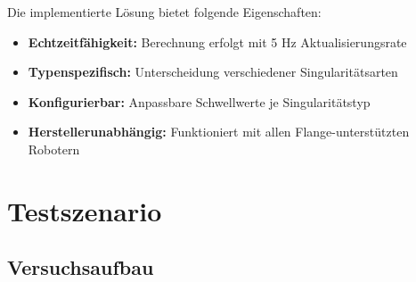 Die implementierte Lösung bietet folgende Eigenschaften:
\begin{itemize}
    \item \textbf{Echtzeitfähigkeit:} Berechnung erfolgt mit 5 Hz Aktualisierungsrate
    \item \textbf{Typenspezifisch:} Unterscheidung verschiedener Singularitätsarten
    \item \textbf{Konfigurierbar:} Anpassbare Schwellwerte je Singularitätstyp
    \item \textbf{Herstellerunabhängig:} Funktioniert mit allen Flange-unterstützten Robotern
\end{itemize}

\section{Testszenario}
\subsection{Versuchsaufbau}
